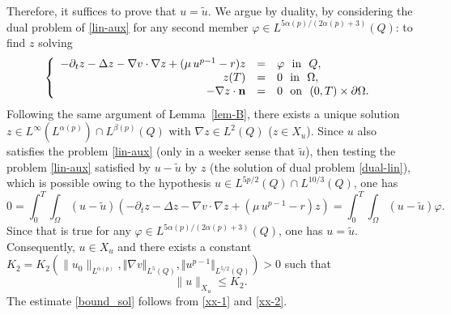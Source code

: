 \documentclass[11pt,reqno]{amsart}%
\numberwithin{equation}{section}
\begin{document}
{Therefore, it suffices to prove that $u=\widetilde u.$ We argue by duality,  by considering the dual problem of \eqref{lin-aux} for any second member $\varphi\in L^{5\alpha(p)/(2\alpha(p)+3)}(Q)$: to find $z$ solving
 \begin{equation}\label{dual-lin}
 \left\{
 \begin{array}{rcl}
- \partial_t z-\Delta z- \nabla v\cdot \nabla z+(\mu\, u^{p-1}-r) z&=& \varphi\ \mbox{ in }\ Q,\\
 z(T)&=&0\ \mbox{ in }\ \Omega,\\
 -\nabla z\cdot{\bf n}&=&0\ \mbox{ on }\ (0,T)\times\partial\Omega.
 \end{array}
 \right.
 \end{equation}
 Following the same argument of  Lemma~\ref{lem-B}, there exists a unique solution 
 $z\in L^\infty (L^{\alpha(p)})\cap L^{\beta(p)}(Q)$ with $\nabla z\in L^2(Q)$ ($z\in X_u$).  Since $u$ also satisfies  the problem \eqref{lin-aux} (only in a weeker sense that $\widetilde u$), then  testing the  problem \eqref{lin-aux} satisfied by $u-\widetilde u$ by  $z$ (the solution of dual problem \eqref{dual-lin}), 
 which is possible owing to the hypothesis $u\in L^{5p/2}(Q)\cap L^{10/3}(Q)$, one has 
$$
0=\int_0^T\int_\Omega(u-\widetilde u)\left(- \partial_t z-\Delta z- \nabla v\cdot \nabla z+(\mu\, u^{p-1}-r) z \right)
=\int_0^T\int_\Omega(u-\widetilde u)\varphi.
$$
Since that is true for any $\varphi\in  L^{5\alpha(p)/(2\alpha(p)+3)}(Q)$, one has $u=\widetilde u$. Consequently, $u\in X_u$ and there exists a constant
${K}_2={K}_2(\|u_0\|_{L ^{\alpha(p)}}, \Vert \nabla v \Vert_{L^{5}(Q)}, \Vert u^{p-1}\Vert_{L^{5/2}(Q)})>0$ such that 
\begin{equation}\label{xx-2}
\|u\|_{X_u}\le K_2.
\end{equation}
The estimate \eqref{bound_sol} follows from \eqref{xx-1} and \eqref{xx-2}.
  

 
 
}
\end{document}
